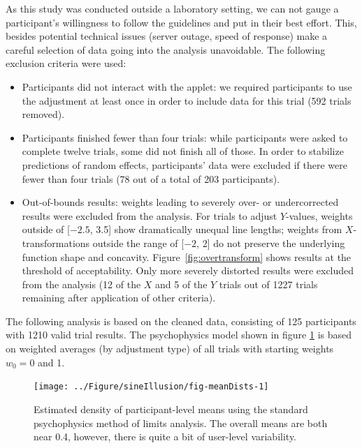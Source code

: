 \documentclass[11pt]{isuthesis}\usepackage[]{graphicx}\usepackage[]{color}
\newenvironment{knitrout}{}{} %
\begin{document}
As this study was conducted outside a laboratory setting, we can not gauge a participant's willingness to follow the guidelines and put in their best effort. This, besides potential technical issues (server outage, speed of response) make a careful selection of data going into the analysis unavoidable. The following exclusion criteria were used:
\begin{itemize}
\item Participants did not interact with the applet: we required participants to use the adjustment at least once in order to include data for this trial (592 trials removed).
\item Participants finished fewer than four trials: while participants were asked to complete twelve trials, some did not finish all of those. In order to stabilize predictions of random effects, participants' data were excluded if there were fewer than four trials (78 out of a total of 203 participants).
\item Out-of-bounds results: weights leading to severely over- or undercorrected results were excluded from the analysis. 
For trials to adjust $Y$-values, weights outside of [\ensuremath{-2.5}, 3.5]  show dramatically unequal line lengths; weights from $X$-transformations outside the range of [\ensuremath{-2}, 2] do not preserve the underlying function shape and concavity. 
Figure~\ref{fig:overtransform} shows results at the threshold of acceptability. Only more severely distorted results were excluded from the analysis (12 of the $X$ and 5 of the $Y$ trials out of 1227 trials remaining after application of other criteria).
\end{itemize}


The following analysis is based on the cleaned data, consisting of 125 participants with 1210 valid trial results. The psychophysics model shown in figure \ref{fig:psycho} is based on  weighted averages (by adjustment type) of all trials with starting weights $w_0 = 0$ and 1.


\begin{figure}\centering
\begin{knitrout}
\color{fgcolor}

{\centering \texttt{[image: ../Figure/sineIllusion/fig-meanDists-1]} 

}



\end{knitrout}
\caption[Results from psychophysics analysis]{Estimated density of participant-level means using the standard psychophysics method of limits analysis. The overall means are both near 0.4, however, there is quite a bit of user-level variability.\label{fig:psycho}}
\end{figure}
\end{document}
